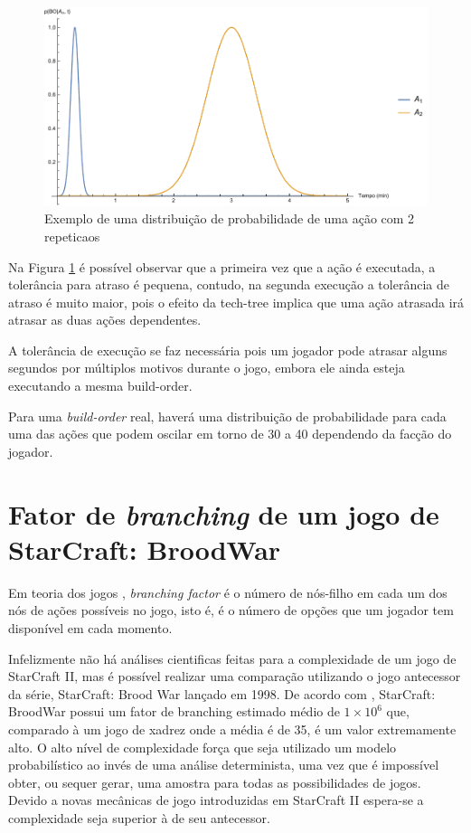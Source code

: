\begin{figure}[htb]
	\caption{\label{fig:rev-distribuicao-exemplo}Exemplo de uma distribuição de probabilidade de uma ação com 2 \glspl{repeticao}}
	\begin{center}
	    \includegraphics[width=\linewidth]{../Mathematica/Distribuicao1.pdf}
	\end{center}
\end{figure}

Na Figura \ref{fig:rev-distribuicao-exemplo} é possível observar que a primeira vez que a ação é executada, a tolerância para atraso é pequena, contudo, na segunda execução a tolerância de atraso é muito maior, pois o efeito da \gls{tech-tree} implica que uma ação atrasada irá atrasar as duas ações dependentes.

A tolerância de execução se faz necessária pois um jogador pode atrasar alguns segundos por múltiplos motivos durante o jogo, embora ele ainda esteja executando a mesma build-order.

Para uma \textit{\gls{build-order}} real, haverá uma distribuição de probabilidade para cada uma das ações que podem oscilar em torno de 30 a 40 dependendo da facção do jogador.

		\section{Fator de \textit{branching} de um jogo de StarCraft: BroodWar}
Em teoria dos jogos , \textit{branching factor} é o número de nós-filho em cada um dos nós de ações possíveis no jogo, isto é, é o número de opções que um jogador tem disponível em cada momento.

Infelizmente não há análises cientificas feitas para a complexidade de um jogo de StarCraft II, mas é possível realizar uma comparação utilizando o jogo antecessor da série, StarCraft: Brood War lançado em 1998. De acordo com \cite{weber2009data}, StarCraft: BroodWar possui um fator de branching estimado médio de $1 \times 10^6$ que, comparado à um jogo de xadrez onde a média é de 35, é um valor extremamente alto. O alto nível de complexidade força que seja utilizado um modelo probabilístico ao invés de uma análise determinista, uma vez que é impossível obter, ou sequer gerar, uma amostra para todas as possibilidades de jogos. Devido a novas mecânicas de jogo introduzidas em StarCraft II espera-se a complexidade seja superior à de seu antecessor.

